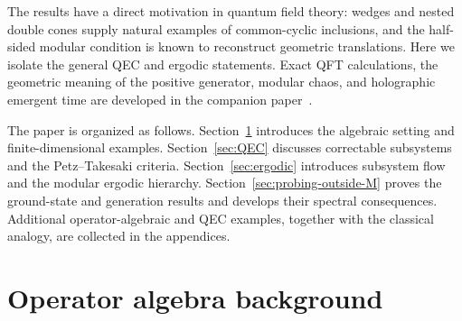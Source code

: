 \documentclass[a4paper,11pt]{article}
\theoremstyle{definition}
\begin{document}
The results have a direct motivation in quantum field theory: wedges and nested double cones supply natural examples of common-cyclic inclusions, and the half-sided modular condition is known to reconstruct geometric translations. Here we isolate the general QEC and ergodic statements. Exact QFT calculations, the geometric meaning of the positive generator, modular chaos, and holographic emergent time are developed in the companion paper~\cite{companionQFT}.

The paper is organized as follows. Section~\ref{section:basics} introduces the algebraic setting and finite-dimensional examples. Section~\ref{sec:QEC} discusses correctable subsystems and the Petz--Takesaki criteria. Section~\ref{sec:ergodic} introduces subsystem flow and the modular ergodic hierarchy. Section~\ref{sec:probing-outside-M} proves the ground-state and generation results and develops their spectral consequences. Additional operator-algebraic and QEC examples, together with the classical analogy, are collected in the appendices.

\section{Operator algebra background}\label{section:basics}
\end{document}
